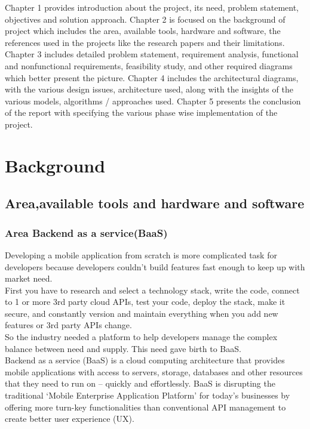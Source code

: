\documentclass[a4paper,12pt]{report}
\begin{document}
Chapter 1 provides introduction about the project, its need, problem statement, objectives and solution approach.
Chapter 2 is focused on the background of project which includes the area, available tools, hardware and software, the references used in the projects like the research papers and their limitations.
Chapter 3 includes detailed problem statement, requirement analysis, functional and nonfunctional requirements, feasibility study, and other required diagrams which better present the picture.
Chapter 4 includes the architectural diagrams, with the various design issues, architecture used, along with the insights of the various models, algorithms / approaches used.
Chapter 5 presents the conclusion of the report with specifying the various phase wise implementation of the project.

    
    
    \chapter {Background}        
    \section{Area,available tools and hardware and software}
    \subsection{Area Backend as a service(BaaS)}    
    Developing a mobile application from scratch is more complicated task for developers because developers couldn’t build features fast enough to keep up with market need. \\
    First you have to research and select a technology stack, write the code, connect to 1 or more 3rd party cloud APIs, test your code, deploy the stack, make it secure, and constantly version and maintain everything when you add new features or 3rd party APIs change. \\
    So the industry needed a platform to help developers manage the complex balance between need and supply. This need gave birth to BaaS. \\    
    Backend as a service (BaaS) is a cloud computing architecture that provides mobile applications with access to servers, storage, databases and other resources that they need to run on – quickly and effortlessly. BaaS is disrupting the traditional ‘Mobile Enterprise Application Platform’ for today’s businesses by offering more turn-key functionalities than conventional API management to create better user experience (UX). \\
    
\end{document}
